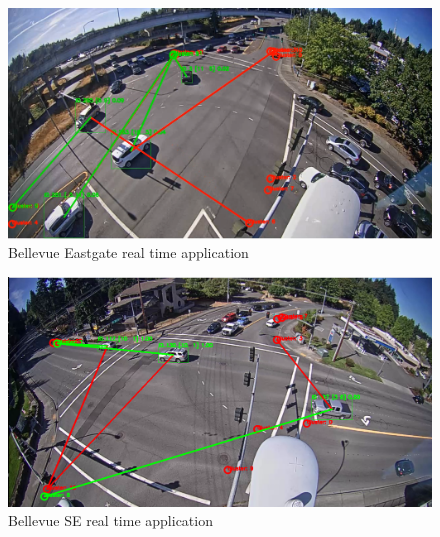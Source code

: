 \documentclass[acmtog, authorversion]{acmart}
\begin{document}
\begin{figure}[H]
    \includegraphics[width=1\columnwidth]{visualization/bellevue_eastgate.png}
    \caption{Bellevue Eastgate real time application}
    \label{fig: BellevueEastgateRealTime}
\end{figure}

\begin{figure}[H]
    \includegraphics[width=1\columnwidth]{visualization/bellevue_se.png}
    \caption{Bellevue SE real time application}
    \label{fig: BellevueSERealTime}
\end{figure}
\end{document}
